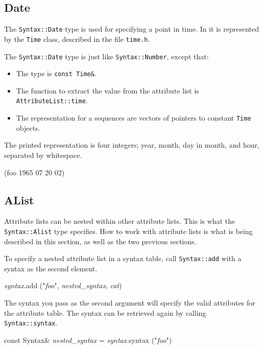 \documentclass{article}
\newcommand{\cplusplus}%
{{\leavevmode{\rm{\hbox{C\hskip -0.1ex\raise 0.5ex\hbox{\tiny ++}}}}}}
\newcommand{\code}[1]{\texttt{#1}}
\newcommand{\file}[1]{\texttt{#1}}
\begin{document}
\subsection{Date}

The \code{Syntax::Date} type is used for specifying a point in time.
In \cplusplus{} it is represented by the \code{Time} class, described
in the file \file{time.h}.

The \code{Syntax::Date} type is just like \code{Syntax::Number},
except that:
\begin{itemize}
\item The \cplusplus{} type is \code{const Time\&}.
\item The function to extract the value from the attribute list is\\
  \code{AttributeList::time}. 
\item The \cplusplus{} representation for a sequences are vectors of
  pointers to constant \code{Time} objects.
\end{itemize}

The printed representation is four integers; year, month, day in
month, and hour, separated by whitespace.
\begin{center}
  \begin{tt}
    (foo 1965 07 20 02)
  \end{tt}
\end{center}

\subsection{AList}

Attribute lists can be nested within other attribute lists.  This is
what the \code{Syntax::Alist} type specifies.  How to work with
attribute lists is what is being described in this section, as well as
the two previous sections.  

To specify a nested attribute list in a syntax table, call
\code{Syntax::add} with a syntax as the second element.
\begin{center}
  \begin{tt}
    \textit{syntax}.add ("\textit{foo}", 
                         \textit{nested\_syntax}, \textit{cat})
  \end{tt}
\end{center}
The syntax you pass as the second argument will specify the valid
attributes for the attribute table.  The syntax can be retrieved again
by calling \code{Syntax::syntax}.
\begin{center}
  \begin{tt}
    const Syntax\& \textit{nested\_syntax}
      = \textit{syntax}.syntax ("\textit{foo}")
  \end{tt}
\end{center}
\end{document}
